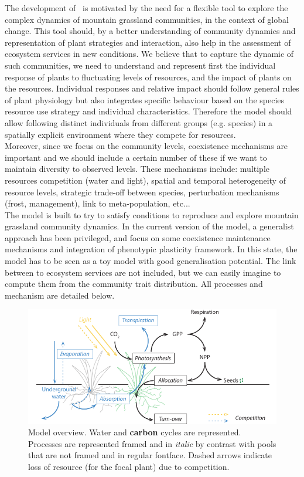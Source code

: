 The development of \model ~is motivated by the need for a flexible tool to explore the complex dynamics of mountain grassland communities, in the context of global change. This tool should, by a better understanding of community dynamics and representation of plant strategies and interaction, also help in the assessment of ecosystem services in new conditions. We believe that to capture the dynamic of such communities, we need to understand and represent first the individual response of plants to fluctuating levels of resources, and the impact of plants on the resources. Individual responses and relative impact should follow general rules of plant physiology but also integrates specific behaviour based on the species resource use strategy and individual characteristics. Therefore the model should allow following distinct individuals from different groups (e.g. species) in a spatially explicit environment where they compete for resources.\\
\indent Moreover, since we focus on the community levels, coexistence mechanisms are important and we should include a certain number of these if we want to maintain diversity to observed levels. These mechanisms include: multiple resources competition (water and light), spatial and temporal heterogeneity of resource levels, strategic trade-off between species, perturbation mechanisms (frost, management), link  to meta-population, etc...\\
\indent The model is built to try to satisfy conditions to reproduce and explore mountain grassland community dynamics. In the current version of the model, a generalist approach has been privileged, and focus on some coexistence maintenance mechanisms and integration of phenotypic plasticity framework. In this state, the model has to be seen as a toy model with good generalisation potential. The link between to ecosystem services are not included, but we can easily imagine to compute them from the community trait distribution. All processes and mechanism are detailed below.

\begin{figure}
\includegraphics[width = 1\linewidth]{./1_Introduction/graphics/model_cycles.pdf}
\caption{Model overview. \textcolor{myBlue}{Water} and \textbf{carbon} cycles are represented. Processes are represented framed and in \textit{italic} by contrast with pools that are not framed and in regular fontface. Dashed arrows indicate loss of resource (for the \textcolor{myGreen}{focal plant}) due to competition.}\label{fig:overview}
\end{figure}


